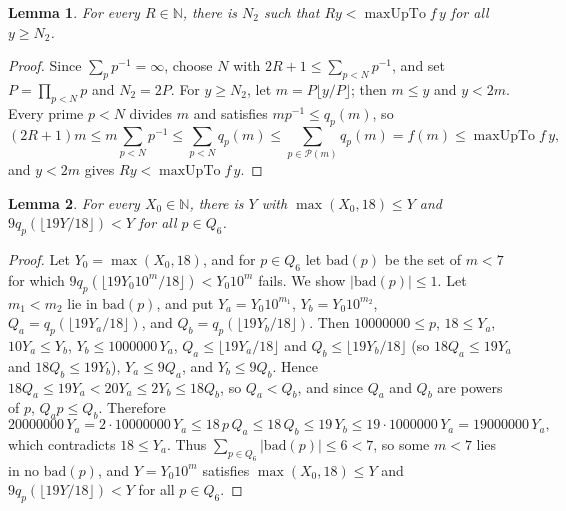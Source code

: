 \documentclass[11pt,a4paper]{amsart}
\newtheorem{lemma}{Lemma}
\newcommand{\maxUpTo}{\operatorname{maxUpTo}}
\begin{document}
\begin{lemma}\label{lem:superlinear}
For every $R \in \mathbb{N}$, there is $N_2$ such that $R y < \maxUpTo f\, y$ for all $y \ge N_2$.
\end{lemma}

\begin{proof}
Since $\sum_{p} p^{-1} = \infty$, choose $N$ with $2R + 1 \le \sum_{p < N} p^{-1}$, and set $P = \prod_{p < N} p$ and $N_2 = 2P$. For $y \ge N_2$, let $m = P \lfloor y / P \rfloor$; then $m \le y$ and $y < 2m$. Every prime $p < N$ divides $m$ and satisfies $m p^{-1} \le q_p(m)$, so
\[
(2R + 1) m \le m \sum_{p < N} p^{-1} \le \sum_{p < N} q_p(m) \le \sum_{p \in \mathcal{P}(m)} q_p(m) = f(m) \le \maxUpTo f\, y,
\]
and $y < 2m$ gives $R y < \maxUpTo f\, y$.
\end{proof}

\begin{lemma}\label{lem:good-Y}
For every $X_0 \in \mathbb{N}$, there is $Y$ with $\max(X_0, 18) \le Y$ and $9 q_p(\lfloor 19 Y / 18 \rfloor) < Y$ for all $p \in Q_6$.
\end{lemma}

\begin{proof}
Let $Y_0 = \max(X_0, 18)$, and for $p \in Q_6$ let $\mathrm{bad}(p)$ be the set of $m < 7$ for which $9 q_p(\lfloor 19 Y_0 10^m / 18 \rfloor) < Y_0 10^m$ fails. We show $|\mathrm{bad}(p)| \le 1$. Let $m_1 < m_2$ lie in $\mathrm{bad}(p)$, and put $Y_a = Y_0 10^{m_1}$, $Y_b = Y_0 10^{m_2}$, $Q_a = q_p(\lfloor 19 Y_a / 18 \rfloor)$, and $Q_b = q_p(\lfloor 19 Y_b / 18 \rfloor)$. Then $10000000 \le p$, $18 \le Y_a$, $10 Y_a \le Y_b$, $Y_b \le 1000000\, Y_a$, $Q_a \le \lfloor 19 Y_a / 18 \rfloor$ and $Q_b \le \lfloor 19 Y_b / 18 \rfloor$ (so $18 Q_a \le 19 Y_a$ and $18 Q_b \le 19 Y_b$), $Y_a \le 9 Q_a$, and $Y_b \le 9 Q_b$. Hence $18 Q_a \le 19 Y_a < 20 Y_a \le 2 Y_b \le 18 Q_b$, so $Q_a < Q_b$, and since $Q_a$ and $Q_b$ are powers of $p$, $Q_a p \le Q_b$. Therefore
\[
20000000\, Y_a = 2 \cdot 10000000\, Y_a \le 18\, p\, Q_a \le 18\, Q_b \le 19\, Y_b \le 19 \cdot 1000000\, Y_a = 19000000\, Y_a,
\]
which contradicts $18 \le Y_a$. Thus $\sum_{p \in Q_6} |\mathrm{bad}(p)| \le 6 < 7$, so some $m < 7$ lies in no $\mathrm{bad}(p)$, and $Y = Y_0 10^m$ satisfies $\max(X_0, 18) \le Y$ and $9 q_p(\lfloor 19 Y / 18 \rfloor) < Y$ for all $p \in Q_6$.
\end{proof}
\end{document}
